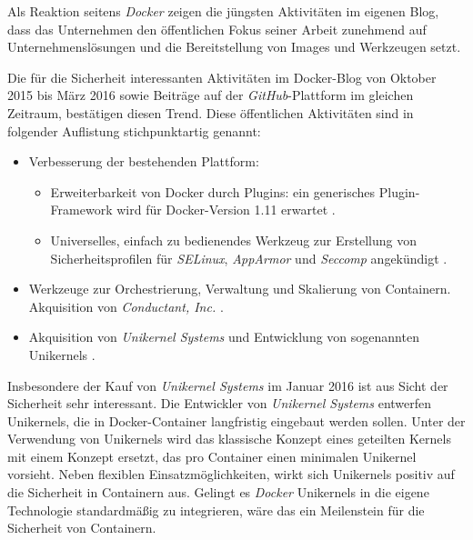 \documentclass[../main.tex]{subfiles}
\begin{document}
  \clearpage

  Als Reaktion seitens \emph{Docker} zeigen die jüngsten Aktivitäten im eigenen Blog, dass das Unternehmen den öffentlichen Fokus seiner Arbeit zunehmend auf Unternehmenslösungen und die Bereitstellung von Images und Werkzeugen setzt.

  Die für die Sicherheit interessanten Aktivitäten im Docker-Blog von Oktober 2015 bis März 2016 sowie Beiträge auf der \emph{GitHub}-Plattform im gleichen Zeitraum, bestätigen diesen Trend. Diese öffentlichen Aktivitäten sind in folgender Auflistung stichpunktartig genannt:

  \begin{itemize}
    \item Verbesserung der bestehenden Plattform:
      \begin{itemize}
        \item Erweiterbarkeit von Docker durch Plugins: ein generisches Plugin-Framework wird für Docker-Version 1.11 erwartet \cite{githubDockerRoadmap}\cite{githubAuthZPluginInfrastructure}.
        \item Universelles, einfach zu bedienendes Werkzeug zur Erstellung von Sicherheitsprofilen für \emph{SELinux}, \emph{AppArmor} und \emph{Seccomp} angekündigt \cite{githubGeneralSecProfiles}.
      \end{itemize}
    \item Werkzeuge zur Orchestrierung, Verwaltung und Skalierung von Containern. Ak­qui­si­ti­on von \emph{Conductant, Inc.} \cite{dockerAurora}.
    \item Ak­qui­si­ti­on von \emph{Unikernel Systems} und Entwicklung von sogenannten Unikernels \cite{dockerUnikernel}.
  \end{itemize}

  Insbesondere der Kauf von \emph{Unikernel Systems} im Januar 2016 ist aus Sicht der Sicherheit sehr interessant. Die Entwickler von \emph{Unikernel Systems} entwerfen Unikernels, die in Docker-Container langfristig eingebaut werden sollen. Unter der Verwendung von Unikernels wird das klassische Konzept eines geteilten Kernels mit einem Konzept ersetzt, das pro Container einen minimalen Unikernel vorsieht. Neben flexiblen Einsatzmöglichkeiten, wirkt sich Unikernels positiv auf die Sicherheit in Containern aus. Gelingt es \emph{Docker} Unikernels in die eigene Technologie standardmäßig zu integrieren, wäre das ein Meilenstein für die Sicherheit von Containern.
\end{document}
